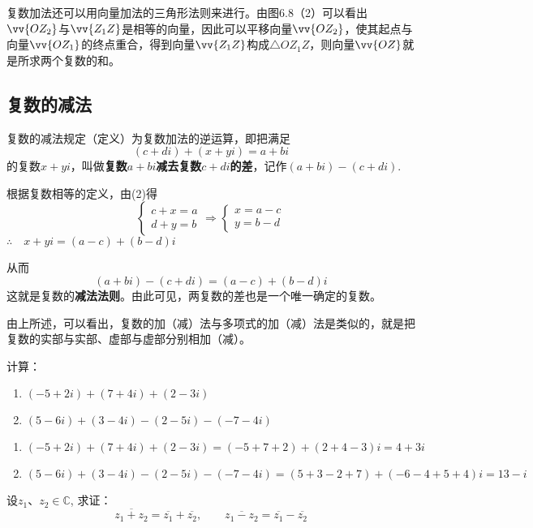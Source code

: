 复数加法还可以用向量加法的三角形法则来进行。由图6.8（2）可以看出$\vv{OZ_2}$与$\vv{Z_1Z}$是相等的向量，因此可以平移向量$\vv{OZ_2}$，使其起点与向量$\vv{OZ_1}$的终点重合，得到向量$\vv{Z_1Z}$构成$\triangle OZ_1Z$，则向量$\vv{OZ}$就是所求两个复数的和。

\subsection{复数的减法}
复数的减法规定（定义）为复数加法的逆运算，即把满足
\begin{equation}
    (c+di)+(x+yi)=a+bi  \tag{2}
\end{equation}
的复数$x+yi$，叫做\textbf{复数$a+bi$减去复数$c+di$的差}，记作$(a+bi)-(c+di)$.

根据复数相等的定义，由(2)得
\[\begin{cases}
    c+x=a\\d+y=b
\end{cases}\Longrightarrow \begin{cases}
    x=a-c\\y=b-d
\end{cases}\]
$\therefore\quad x+yi=(a-c)+(b-d)i$

从而
\[(a+bi)-(c+di)=(a-c)+(b-d)i\]
这就是复数的\textbf{减法法则}。由此可见，两复数的差也是一个唯一确定的复数。

由上所述，可以看出，复数的加（减）法与多项式的加（减）法是类似的，就是把复数的实部与实部、虚部与虚部分别相加（减）。

\begin{example}
    计算：
\begin{enumerate}[(1)]
\item $(-5+2i)+(7+4i)+(2-3i)$
\item $(5-6i)+(3-4i)-(2-5i)-(-7-4i)$
\end{enumerate}
\end{example}

\begin{solution}
\begin{enumerate}[(1)]
    \item $(-5+2i)+(7+4i)+(2-3i)=(-5+7+2)+(2+4-3)i=4+3i$
\item $(5-6i)+(3-4i)-(2-5i)-(-7-4i)=(5+3-2+7)+(-6-4+5+4)i=13-i$
\end{enumerate}
\end{solution}

\begin{example}
    设$z_1$、$z_2\in \mathbb{C}$, 求证：
$$\overline{z_{1}+z_{2}}=\overline{z_{1}}+\overline{z_{2}},\qquad\overline{z_{1}-z_{2}}=\overline{z_{1}}-\overline{z_{2}}$$
\end{example}


